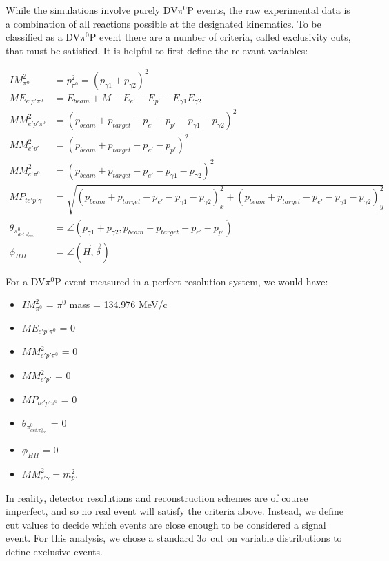 While the simulations involve purely DV$\pi^0$P events, the raw experimental data is a combination of all reactions possible at the designated kinematics. To be classified as a DV$\pi^0$P event there are a number of criteria, called exclusivity cuts, that must be satisfied. It is helpful to first define the relevant variables:


\begin{align}
IM^{2}_{\pi^{0}} &= p^{2}_{\pi^{0}} = (p_{\gamma1} + p_{\gamma2})^{2}  \\
ME_{e'p'\pi^{0}} &= E_{beam} + M - E_{e'} - E_{p'} - E_{\gamma1}E_{\gamma2} \\
MM^{2}_{e'p'\pi^{0}} &= (p_{beam} + p_{target} - p_{e'} - p_{p'} - p_{\gamma1} - p_{\gamma2})^{2}  \\
MM^{2}_{e'p'} &= (p_{beam} + p_{target} - p_{e'} - p_{p'})^{2} \\
MM^{2}_{e'\pi^{0}} &= (p_{beam} + p_{target} - p_{e'} - p_{\gamma1} - p_{\gamma2})^{2} \\
MP_{te'p'\gamma} &= \sqrt{(p_{beam} + p_{target} - p_{e'} - p_{\gamma1} - p_{\gamma2})^{2}_{x} + (p_{beam} + p_{target} - p_{e'} - p_{\gamma1} - p_{\gamma2})^{2}_{y}}\\
\theta_{\pi^{0}_{det.\pi^{0}_{rec.}}} &= \angle(p_{\gamma1} + p_{\gamma2} , p_{beam} + p_{target} - p_{e'} - p_{p'}) \\
\phi_{H\Pi} &= \angle(\vec{H}, \vec{\delta})
\end{align}

For a DV$\pi^0$P event measured in a perfect-resolution system, we would have:
\begin{itemize}
    \item $IM^{2}_{\pi^{0}}$ = $\pi^0$ mass = 134.976 MeV/c 
    \item $ME_{e'p'\pi^{0}}$ = 0 
    \item $MM^{2}_{e'p'\pi^{0}}$ = 0 
    \item $MM^{2}_{e'p'}$ = 0 
    \item $MP_{te'p'\pi^{0}}$ = 0 
    \item $\theta_{\pi^{0}_{det.\pi^{0}_{rec.}}}$ = 0 
    \item $\phi_{H\Pi}$ = 0 
    \item $MM^{2}_{e'\gamma} = m^{2}_{p}$.
\end{itemize}


In reality, detector resolutions and reconstruction schemes are of course imperfect, and so no real event will satisfy the criteria above. Instead, we define cut values to decide which events are close enough to be considered a signal event.  For this analysis, we chose a standard 3$\sigma$ cut on variable distributions to define exclusive events. 


